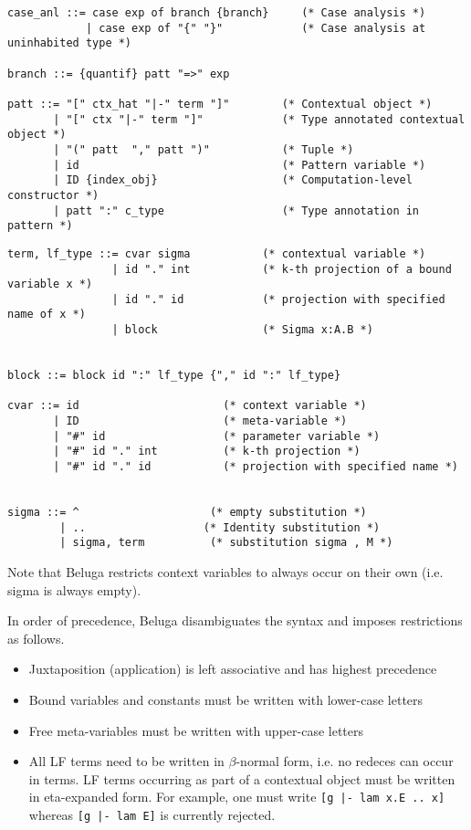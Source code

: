 \documentclass[11pt]{article}
\begin{document}
\begin{verbatim}
case_anl ::= case exp of branch {branch}     (* Case analysis *)
            | case exp of "{" "}"            (* Case analysis at uninhabited type *)

branch ::= {quantif} patt "=>" exp

patt ::= "[" ctx_hat "|-" term "]"        (* Contextual object *)
       | "[" ctx "|-" term "]"            (* Type annotated contextual object *)
       | "(" patt  "," patt ")"           (* Tuple *)
       | id                               (* Pattern variable *)
       | ID {index_obj}                   (* Computation-level constructor *)
       | patt ":" c_type                  (* Type annotation in pattern *)
\end{verbatim}

\begin{verbatim}
term, lf_type ::= cvar sigma           (* contextual variable *)
                | id "." int           (* k-th projection of a bound variable x *)
                | id "." id            (* projection with specified name of x *)
                | block                (* Sigma x:A.B *)


block ::= block id ":" lf_type {"," id ":" lf_type}

cvar ::= id                      (* context variable *)
       | ID                      (* meta-variable *)
       | "#" id                  (* parameter variable *)
       | "#" id "." int          (* k-th projection *)
       | "#" id "." id           (* projection with specified name *)   


sigma ::= ^                    (* empty substitution *)
        | ..                  (* Identity substitution *)
        | sigma, term          (* substitution sigma , M *)

\end{verbatim}
Note that Beluga restricts context variables to always occur on their own (i.e. sigma is always empty).

In order of precedence, Beluga disambiguates the syntax and imposes restrictions as follows.
\begin{itemize}
\item Juxtaposition (application) is left associative and has highest precedence
\item Bound variables and constants must be written with lower-case letters
\item Free meta-variables must be written with upper-case letters
\item All LF terms need to be written in $\beta$-normal form, i.e. no redeces can occur in terms. LF terms occurring as part of a contextual object must be written in eta-expanded form. For example, one must write \texttt{[g |- lam x.E .. x]} whereas \texttt{[g |- lam E]} is currently rejected.
\end{itemize}
\end{document}
